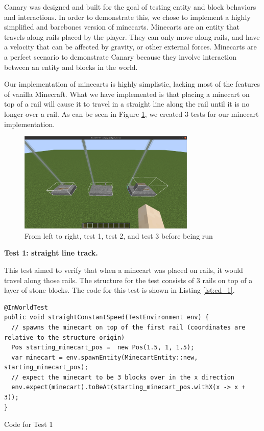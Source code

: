 \documentclass[12pt]{article}
\begin{document}
\begin{onehalfspacing}
Canary was designed and built for the goal of testing entity and
block behaviors and interactions. In order to demonstrate this, we chose
to implement a highly simplified and barebones version of minecarts.
Minecarts are an entity that travels along rails placed by the player.
They can only move along rails, and have a velocity that can be affected
by gravity, or other external forces. Minecarts are a perfect scenario
to demonstrate Canary because they involve interaction between an entity
and blocks in the world.

Our implementation of minecarts is highly simplistic, lacking most of
the features of vanilla Minecraft. What we have implemented is that
placing a minecart on top of a rail will cause it to travel in a
straight line along the rail until it is no longer over a rail. As can
be seen in Figure \ref{fig:5_1_1_1}, we created 3 tests for our minecart
implementation.

\begin{figure}[H] 
    \centering
    \includegraphics[width=0.75\textwidth]{media/media/image15.png} 
    \caption{From left to right, test 1, test 2, and test 3 before being run}
    \label{fig:5_1_1_1}  
\end{figure}


\noindent\textbf{Test 1: straight line track.}

This test aimed to verify that when a minecart was placed on rails, it
would travel along those rails. The structure for the test consists of 3
rails on top of a layer of stone blocks. The code for this test is shown
in Listing \ref{lst:cd_1}.


\begin{listing}[H]
\begin{verbatim}
@InWorldTest
public void straightConstantSpeed(TestEnvironment env) {
  // spawns the minecart on top of the first rail (coordinates are relative to the structure origin)
  Pos starting_minecart_pos =  new Pos(1.5, 1, 1.5);
  var minecart = env.spawnEntity(MinecartEntity::new, starting_minecart_pos);
  // expect the minecart to be 3 blocks over in the x direction
  env.expect(minecart).toBeAt(starting_minecart_pos.withX(x -> x + 3));
}
\end{verbatim}
\caption{Code for Test 1}
\label{lst:cd_1}
\end{listing}


\end{onehalfspacing}
\end{document}
